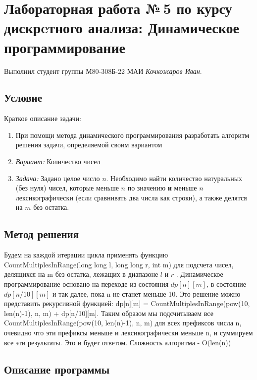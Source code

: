 \documentclass[12pt]{article}
\begin{document}
\section*{Лабораторная работа №\,5 по курсу дискрeтного анализа: Динамическое программирование}

Выполнил студент группы М80-308Б-22 МАИ \textit{Кочкожаров Иван}.

\subsection*{Условие}

Краткое описание задачи:
\begin{enumerate}
    \item При помощи метода динамического программирования разработать алгоритм решения задачи, определяемой
    своим вариантом
    \item \textit{Вариант:} Количество чисел
    \item \textit{Задача:} Задано целое число $n$. Необходимо найти количество натуральных (без нуля) чисел, которые меньше $n$ по значению \textbf{и} меньше $n$ лексикографически (если сравнивать два числа как строки), а также делятся на $m$ без остатка.
\end{enumerate}

\subsection*{Метод решения}

Будем на каждой итерации цикла применять функцию CountMultiplesInRange(long long l, long long r, int m) для подсчета чисел, делящихся на m без остатка, лежащих в диапазоне $l$ и $r$ . Динамическое программирование основано на переходе из состояния $dp[n][m]$, в состояние $dp[n/10][m]$ и так далее, пока n не станет меньше 10. 
Это решение можно представить рекурсивной функцией: dp[n][m] = CountMultiplesInRange(pow(10, len(n)-1), n, m) + dp[n/10][m]. Таким образом мы подсчитываем все CountMultiplesInRange(pow(10, len(n)-1), n, m) для всех префиксов числа n, очевидно что эти префиксы меньше и лексикографически меньше n, и суммируем все эти результаты. Это и будет ответом.
Сложность алгоритма - O(len(n))

\subsection*{Описание программы}
\end{document}
